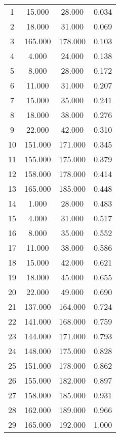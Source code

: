 % 
\begin{tabular}{cccc}
  \hline
  \hline
1 & 15.000 & 28.000 & 0.034 \\ 
  2 & 18.000 & 31.000 & 0.069 \\ 
  3 & 165.000 & 178.000 & 0.103 \\ 
  4 & 4.000 & 24.000 & 0.138 \\ 
  5 & 8.000 & 28.000 & 0.172 \\ 
  6 & 11.000 & 31.000 & 0.207 \\ 
  7 & 15.000 & 35.000 & 0.241 \\ 
  8 & 18.000 & 38.000 & 0.276 \\ 
  9 & 22.000 & 42.000 & 0.310 \\ 
  10 & 151.000 & 171.000 & 0.345 \\ 
  11 & 155.000 & 175.000 & 0.379 \\ 
  12 & 158.000 & 178.000 & 0.414 \\ 
  13 & 165.000 & 185.000 & 0.448 \\ 
  14 & 1.000 & 28.000 & 0.483 \\ 
  15 & 4.000 & 31.000 & 0.517 \\ 
  16 & 8.000 & 35.000 & 0.552 \\ 
  17 & 11.000 & 38.000 & 0.586 \\ 
  18 & 15.000 & 42.000 & 0.621 \\ 
  19 & 18.000 & 45.000 & 0.655 \\ 
  20 & 22.000 & 49.000 & 0.690 \\ 
  21 & 137.000 & 164.000 & 0.724 \\ 
  22 & 141.000 & 168.000 & 0.759 \\ 
  23 & 144.000 & 171.000 & 0.793 \\ 
  24 & 148.000 & 175.000 & 0.828 \\ 
  25 & 151.000 & 178.000 & 0.862 \\ 
  26 & 155.000 & 182.000 & 0.897 \\ 
  27 & 158.000 & 185.000 & 0.931 \\ 
  28 & 162.000 & 189.000 & 0.966 \\ 
  29 & 165.000 & 192.000 & 1.000 \\ 
   \hline
\end{tabular}
